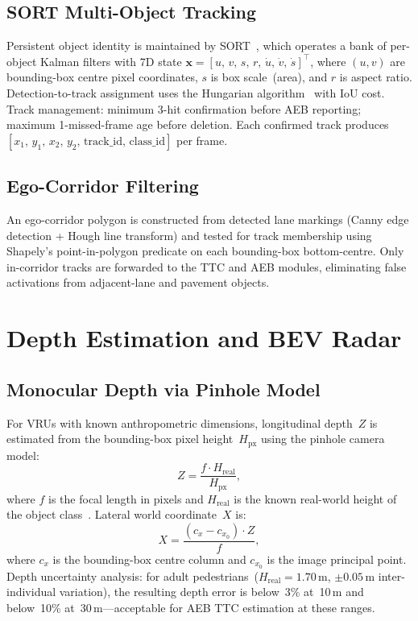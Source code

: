 \documentclass[journal]{IEEEtran}
\begin{document}
\subsection{SORT Multi-Object Tracking}

Persistent object identity is maintained by SORT~\cite{bewley2016},
which operates a bank of per-object Kalman filters with 7D state
$\mathbf{x} = [u,\,v,\,s,\,r,\,\dot{u},\,\dot{v},\,\dot{s}]^{\!\top}$,
where $(u,v)$ are bounding-box centre pixel coordinates, $s$ is box
scale~(area), and $r$ is aspect ratio.
Detection-to-track assignment uses the Hungarian
algorithm~\cite{kuhn1955} with IoU cost.
Track management: minimum 3-hit confirmation before AEB reporting;
maximum 1-missed-frame age before deletion.
Each confirmed track produces
$[x_1,\,y_1,\,x_2,\,y_2,\,\text{track\_id},\,\text{class\_id}]$
per frame.

\subsection{Ego-Corridor Filtering}

An ego-corridor polygon is constructed from detected lane markings
(Canny edge detection + Hough line transform) and tested for track
membership using Shapely's point-in-polygon predicate on each
bounding-box bottom-centre.
Only in-corridor tracks are forwarded to the TTC and AEB modules,
eliminating false activations from adjacent-lane and pavement objects.

\section{Depth Estimation and BEV Radar}
\label{sec:depth}

\subsection{Monocular Depth via Pinhole Model}

For VRUs with known anthropometric dimensions, longitudinal depth~$Z$
is estimated from the bounding-box pixel height~$H_\text{px}$ using
the pinhole camera model:
\begin{equation}
  Z = \frac{f \cdot H_\text{real}}{H_\text{px}},
  \label{eq:depth}
\end{equation}
where $f$ is the focal length in pixels and $H_\text{real}$ is the
known real-world height of the object class~\cite{pheasant2003}.
Lateral world coordinate~$X$ is:
\begin{equation}
  X = \frac{(c_x - c_{x_0})\cdot Z}{f},
  \label{eq:lateral}
\end{equation}
where $c_x$ is the bounding-box centre column and $c_{x_0}$ is the
image principal point.
Depth uncertainty analysis: for adult pedestrians~($H_\text{real} =
1.70$\,m, $\pm0.05$\,m inter-individual variation), the resulting
depth error is below~3\% at~10\,m and below~10\% at~30\,m---acceptable
for AEB TTC estimation at these ranges.
\end{document}

